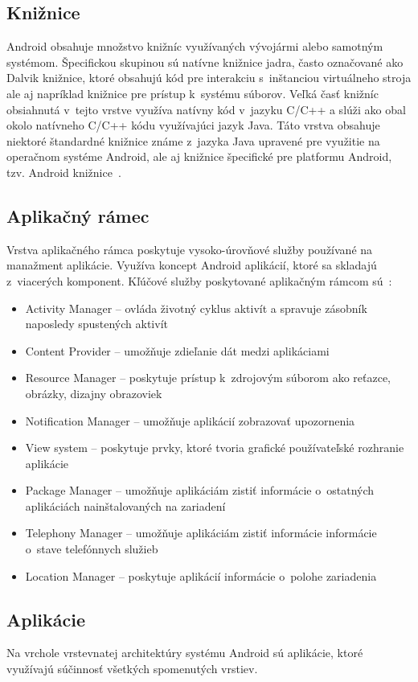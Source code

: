 \subsection{Knižnice}
Android obsahuje množstvo knižníc využívaných vývojármi alebo samotným systémom. Špecifickou skupinou sú natívne knižnice jadra, často označované ako Dalvik knižnice, ktoré obsahujú kód pre interakciu s~inštanciou virtuálneho stroja ale aj napríklad knižnice pre prístup k~systému súborov. Veľká časť knižníc obsiahnutá v~tejto vrstve využíva natívny kód v~jazyku C/C++ a slúži ako obal okolo natívneho C/C++ kódu využívajúci jazyk Java. Táto vrstva obsahuje niektoré štandardné knižnice známe z~jazyka Java upravené pre využitie na operačnom systéme Android, ale aj knižnice špecifické pre platformu Android, tzv. Android knižnice~\cite{architecture}.
\subsection{Aplikačný rámec}
Vrstva aplikačného rámca poskytuje vysoko-úrovňové služby používané na manažment aplikácie. Využíva koncept Android aplikácií, ktoré sa skladajú z~viacerých komponent. Kľúčové služby poskytované aplikačným rámcom sú~\cite{architecture}: 
\begin{itemize}
	\item Activity Manager  --  ovláda životný cyklus aktivít a spravuje zásobník naposledy spustených aktivít
	\item Content Provider  --  umožňuje zdieľanie dát medzi aplikáciami
	\item Resource Manager  --  poskytuje prístup k~zdrojovým súborom ako reťazce, obrázky, dizajny obrazoviek
	\item Notification Manager  --  umožňuje aplikácií zobrazovať upozornenia
	\item View system  --  poskytuje prvky, ktoré tvoria grafické používateľské rozhranie aplikácie
	\item Package Manager  --  umožňuje aplikáciám zistiť informácie o~ostatných aplikáciách nainštalovaných na zariadení
	\item Telephony Manager  --  umožňuje aplikáciám zistiť informácie informácie o~stave telefónnych služieb
	\item Location Manager  --  poskytuje aplikácií informácie o~polohe zariadenia
\end{itemize}
\subsection{Aplikácie}
Na vrchole vrstevnatej architektúry systému Android sú aplikácie, ktoré využívajú súčinnosť všetkých spomenutých vrstiev. 

